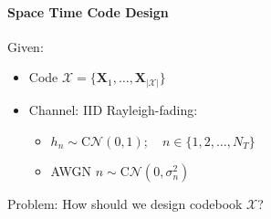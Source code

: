 \documentclass[a4paper, 10pt]{article}
\begin{document}
\paragraph{Space Time Code Design}
Given: 
\begin{itemize}
	\item Code  $\mathscr{X} = \bigl\{\textbf{X}_1,\dots ,\textbf{X}_{|\mathscr{X}|}\bigr\}$
	\item Channel: IID Rayleigh-fading: 
	\begin{itemize}
		\item $h_n \sim \text{C}\mathcal{N}(0,1);\quad n \in \{1, 2, \dots , N_T \} $
		\item AWGN $ n \sim \text{C}\mathcal{N}(0,\sigma _n^2) $
	\end{itemize}
\end{itemize}
Problem: How should we design codebook $\mathscr{X}$?
\end{document}
